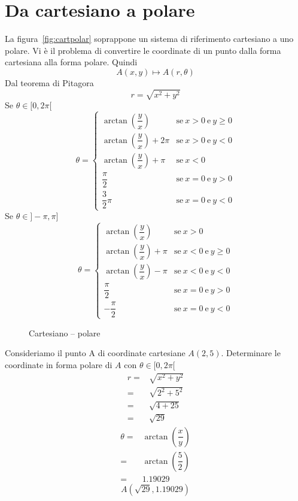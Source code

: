 \section{Da cartesiano a polare}
La figura~\vref{fig:cartpolar} soprappone un sistema di riferimento cartesiano a uno polare. Vi è il problema di convertire le coordinate di un punto dalla forma cartesiana alla forma polare. Quindi 
\[A(x,y)\mapsto A(r,\theta) \]
Dal teorema di Pitagora \[r=\sqrt{x^2+y^2} \]
Se $\theta\in[0,2\pi[$
\[\theta=\begin{cases}
\arctan(\dfrac{y}{x})&\text{se}\ x>0 \ \text{e} \ y\geq0\\[8pt]
\arctan(\dfrac{y}{x})+2\pi&\text{se}\ x>0 \ \text{e} \ y<0\\[8pt]
\arctan(\dfrac{y}{x})+\pi&\text{se}\ x<0\\[8pt]
\dfrac{\pi}{2}&\text{se}\ x=0 \ \text{e} \ y>0\\[8pt]
\dfrac{3}{2}\pi&\text{se}\ x=0 \ \text{e} \ y<0
\end{cases} 
\] 
Se $\theta\in]-\pi,\pi]$
\[\theta=\begin{cases}
\arctan(\dfrac{y}{x})&\text{se}\ x>0 \\[8pt]
\arctan(\dfrac{y}{x})+\pi&\text{se}\ x<0 \ \text{e} \ y\geq0\\[8pt]
\arctan(\dfrac{y}{x})-\pi&\text{se}\ x<0\ \text{e} \ y<0\\[8pt]
\dfrac{\pi}{2}&\text{se}\ x=0 \ \text{e} \ y>0\\[8pt]
-\dfrac{\pi}{2}&\text{se}\ x=0 \ \text{e} \ y<0
\end{cases} 
\]
\begin{figure} %
	\centering
	
	\caption{Cartesiano -- polare}\label{fig:cartpolar}
\end{figure}
\begin{esempiot}{}{} Consideriamo il punto A di coordinate cartesiane $A(2,5)$. Determinare le coordinate in forma polare di $A$ con $\theta\in[0,2\pi[$
	\begin{align*}
	r=&\sqrt{x^2+y^2}\\
	=&\sqrt{2^2+5^2}\\
	=&\sqrt{4+25}\\
	=&\sqrt{29}
	\end{align*}
	\begin{align*}
	\theta=&\arctan\left(\dfrac{x}{y}\right)\\
		 =&\arctan\left(\dfrac{5}{2}\right)\\
	=&1.19029
	\end{align*}
	\[A(\sqrt{29},1.19029) \]
\end{esempiot}
